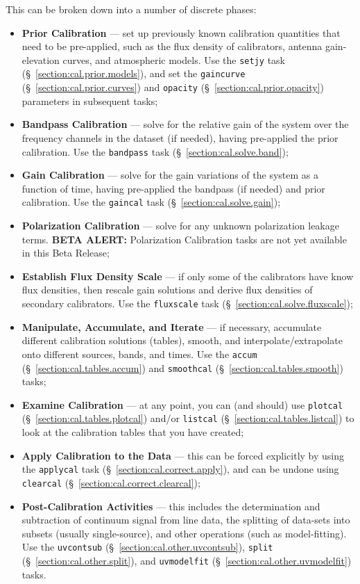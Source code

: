 This can be broken down into a number of discrete phases:
\begin{itemize}
   \item {\bf Prior Calibration} --- set up previously known
      calibration quantities that need to be pre-applied, such
      as the flux density of calibrators, antenna
      gain-elevation curves, and atmospheric models. Use the
      {\tt setjy} task (\S~\ref{section:cal.prior.models}),
      and set the {\tt gaincurve} (\S~\ref{section:cal.prior.curves})
      and {\tt opacity} (\S~\ref{section:cal.prior.opacity}) parameters 
      in subsequent tasks;
   \item {\bf Bandpass Calibration} --- solve
      for the relative gain of the system over the frequency channels 
      in the dataset (if needed), having pre-applied the prior
      calibration. Use the {\tt bandpass} task 
      (\S~\ref{section:cal.solve.band});
   \item {\bf Gain Calibration} --- solve for the gain variations of
      the system as a function of time, having pre-applied the 
      bandpass (if needed) and prior calibration. Use the 
      {\tt gaincal} task (\S~\ref{section:cal.solve.gain});
   \item {\bf Polarization Calibration} --- solve for any unknown
      polarization leakage terms. {\bf BETA ALERT:} Polarization
      Calibration tasks are not yet available in this Beta Release;
   \item {\bf Establish Flux Density Scale} --- if only some of the
      calibrators have know flux densities, then rescale gain
      solutions and derive flux densities of secondary calibrators.
      Use the {\tt fluxscale} task (\S~\ref{section:cal.solve.fluxscale});
   \item {\bf Manipulate, Accumulate, and Iterate} --- if necessary,
      accumulate different calibration solutions (tables), smooth,
      and interpolate/extrapolate onto different sources, bands, and
      times. Use the {\tt accum} (\S~\ref{section:cal.tables.accum}) and
      {\tt smoothcal} (\S~\ref{section:cal.tables.smooth})
      tasks;
   \item {\bf Examine Calibration} --- at any point, you can (and 
      should) use {\tt plotcal} (\S~\ref{section:cal.tables.plotcal}) 
      and/or {\tt listcal} (\S~\ref{section:cal.tables.listcal})
      to look at the calibration tables that you have created;
   \item {\bf Apply Calibration to the Data} --- this can be forced
      explicitly by using the {\tt applycal} task
      (\S~\ref{section:cal.correct.apply}), and can be undone using
      {\tt clearcal} (\S~\ref{section:cal.correct.clearcal});
   \item {\bf Post-Calibration Activities} --- this includes the
      determination and subtraction of continuum signal from line
      data, the splitting of data-sets into subsets (usually
      single-source), and other operations (such as model-fitting).
      Use the {\tt uvcontsub} (\S~\ref{section:cal.other.uvcontsub}),
      {\tt split} (\S~\ref{section:cal.other.split}),
      and {\tt uvmodelfit} (\S~\ref{section:cal.other.uvmodelfit})
      tasks.
\end{itemize}


